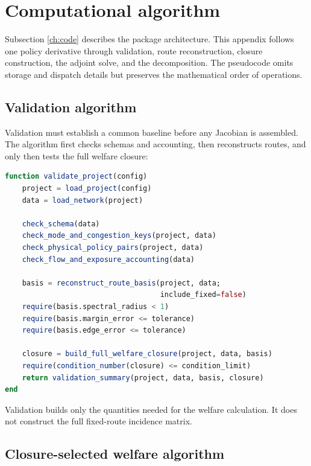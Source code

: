 \section{Computational algorithm}
\label{app:algorithm}

Subsection \ref{ch:code} describes the package architecture. This appendix follows
one policy derivative through validation, route reconstruction, closure
construction, the adjoint solve, and the decomposition. The pseudocode omits
storage and dispatch details but preserves the mathematical order of
operations.

\subsection{Validation algorithm}

Validation must establish a common baseline before any Jacobian is assembled.
The algorithm first checks schemas and accounting, then reconstructs routes,
and only then tests the full welfare closure:
\begin{lstlisting}[language=Julia]
function validate_project(config)
    project = load_project(config)
    data = load_network(project)

    check_schema(data)
    check_mode_and_congestion_keys(project, data)
    check_physical_policy_pairs(project, data)
    check_flow_and_exposure_accounting(data)

    basis = reconstruct_route_basis(project, data;
                                    include_fixed=false)
    require(basis.spectral_radius < 1)
    require(basis.margin_error <= tolerance)
    require(basis.edge_error <= tolerance)

    closure = build_full_welfare_closure(project, data, basis)
    require(condition_number(closure) <= condition_limit)
    return validation_summary(project, data, basis, closure)
end
\end{lstlisting}

Validation builds only the quantities needed for the welfare calculation. It does not
construct the full fixed-route incidence matrix.

\subsection{Closure-selected welfare algorithm}

